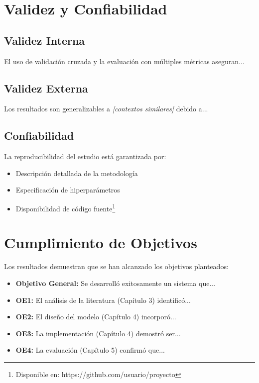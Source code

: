 \section{Validez y Confiabilidad}
\label{sec:validez}

\subsection{Validez Interna}

El uso de validación cruzada y la evaluación con múltiples métricas aseguran...

\subsection{Validez Externa}

Los resultados son generalizables a \textit{[contextos similares]} debido a...

\subsection{Confiabilidad}

La reproducibilidad del estudio está garantizada por:
\begin{itemize}
    \item Descripción detallada de la metodología
    \item Especificación de hiperparámetros
    \item Disponibilidad de código fuente\footnote{Disponible en: https://github.com/usuario/proyecto}
\end{itemize}

\section{Cumplimiento de Objetivos}
\label{sec:cumplimiento_objetivos}

Los resultados demuestran que se han alcanzado los objetivos planteados:

\begin{itemize}
    \item \textbf{Objetivo General:} Se desarrolló exitosamente un sistema que...
    \item \textbf{OE1:} El análisis de la literatura (Capítulo 3) identificó...
    \item \textbf{OE2:} El diseño del modelo (Capítulo 4) incorporó...
    \item \textbf{OE3:} La implementación (Capítulo 4) demostró ser...
    \item \textbf{OE4:} La evaluación (Capítulo 5) confirmó que...
\end{itemize}

